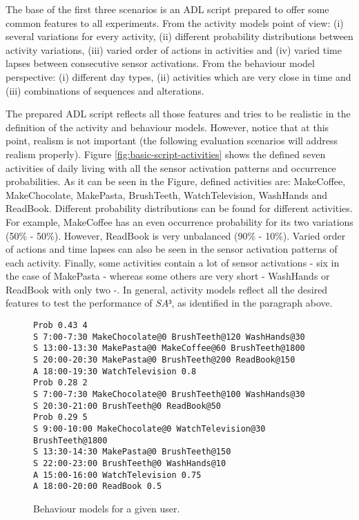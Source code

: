 The base of the first three scenarios is an ADL script prepared to offer some common features to all experiments. From the activity models point of view: (i) several variations for every activity, (ii) different probability distributions between activity variations, (iii) varied order of actions in activities and (iv) varied time lapses between consecutive sensor activations. From the behaviour model perspective: (i) different day types, (ii) activities which are very close in time and (iii) combinations of sequences and alterations.

The prepared ADL script reflects all those features and tries to be realistic in the definition of the activity and behaviour models. However, notice that at this point, realism is not important (the following evaluation scenarios will address realism properly). Figure \ref{fig:basic-script-activities} shows the defined seven activities of daily living with all the sensor activation patterns and occurrence probabilities. As it can be seen in the Figure, defined activities are: MakeCoffee, MakeChocolate, MakePasta, BrushTeeth, WatchTelevision, WashHands and ReadBook. Different probability distributions can be found for different activities. For example, MakeCoffee has an even occurrence probability for its two variations (50\% - 50\%). However, ReadBook is very unbalanced (90\% - 10\%). Varied order of actions and time lapses can also be seen in the sensor activation patterns of each activity. Finally, some activities contain a lot of sensor activations - six in the case of MakePasta - whereas some others are very short - WashHands or ReadBook with only two -. In general, activity models reflect all the desired features to test the performance of $SA³$, as identified in the paragraph above.

\begin{figure}
\begin{small}
\lstset{linewidth=\textwidth}
\begin{lstlisting}
Prob 0.43 4
S 7:00-7:30 MakeChocolate@0 BrushTeeth@120 WashHands@30
S 13:00-13:30 MakePasta@0 MakeCoffee@60 BrushTeeth@1800
S 20:00-20:30 MakePasta@0 BrushTeeth@200 ReadBook@150
A 18:00-19:30 WatchTelevision 0.8
Prob 0.28 2
S 7:00-7:30 MakeChocolate@0 BrushTeeth@100 WashHands@30
S 20:30-21:00 BrushTeeth@0 ReadBook@50
Prob 0.29 5
S 9:00-10:00 MakeChocolate@0 WatchTelevision@30 BrushTeeth@1800
S 13:30-14:30 MakePasta@0 BrushTeeth@150
S 22:00-23:00 BrushTeeth@0 WashHands@10
A 15:00-16:00 WatchTelevision 0.75
A 18:00-20:00 ReadBook 0.5
\end{lstlisting}
\end{small}
\caption{Behaviour models for a given user.}
\label{fig:basic-script-behaviour}
\end{figure}

